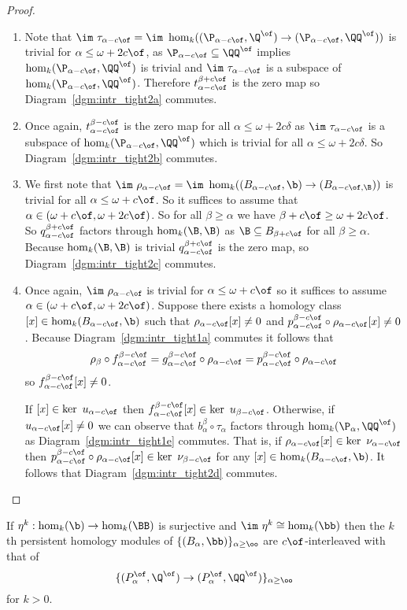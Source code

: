 \begin{proof}
  \begin{enumerate}[label=\Roman*.]
    \item Note that $\im~\tau_{\alpha-c\of} = \im~\hom_k((\P_{\alpha-c\of}, \Q^\of)\to (\P_{\alpha-c\of}, \QQ^\of))$ is trivial for $\alpha\leq \omega+2c\of$, as
    $\P_{\alpha-c\of}\subseteq \QQ^\of$ implies $\hom_k(\P_{\alpha-c\of}, \QQ^\of)$ is trivial and $\im~\tau_{\alpha-c\of}$ is a subspace of $\hom_k(\P_{\alpha-c\of}, \QQ^\of)$.
    Therefore $t_{\alpha-c\of}^{\beta+c\of}$ is the zero map so Diagram~\ref{dgm:intr_tight2a} commutes.
    \item Once again, $t_{\alpha-c\of}^{\beta-c\of}$ is the zero map for all $\alpha\leq\omega+2c\delta$ as $\im~\tau_{\alpha-c\of}$ is a subspace of $\hom_k(\P_{\alpha-c\of}, \QQ^\of)$ which is trivial for all $\alpha\leq\omega+2c\delta$.
    So Diagram~\ref{dgm:intr_tight2b} commutes.
    \item We first note that $\im~\rho_{\alpha-c\of} = \im~\hom_k((B_{\alpha-c\of}, \b)\to (B_{\alpha-c\of, \B}))$ is trivial for all $\alpha\leq \omega+c\of$.
    So it suffices to assume that $\alpha\in (\omega+c\of, \omega+2c\of)$.
    So for all $\beta\geq\alpha$ we have $\beta+c\of\geq\omega+2c\of$.
    So $q_{\alpha-c\of}^{\beta+c\of}$ factors through $\hom_k(\B, \B)$ as $\B\subseteq B_{\beta+c\of}$ for all $\beta\geq\alpha$.
    Because $\hom_k(\B, \B)$ is trivial $q_{\alpha-c\of}^{\beta+c\of}$ is the zero map, so Diagram~\ref{dgm:intr_tight2c} commutes.
    \item Once again, $\im~\rho_{\alpha-c\of}$ is trivial for $\alpha\leq\omega+c\of$ so it suffices to assume $\alpha\in (\omega+c\of, \omega+2c\of)$.
    Suppose there exists a homology class $[x]\in\hom_k(B_{\alpha-c\of}, \b)$ such that $\rho_{\alpha-c\of}[x]\neq 0$ and $p_{\alpha-c\of}^{\beta-c\of}\circ\rho_{\alpha-c\of}[x]\neq 0$.
    Because Diagram~\ref{dgm:intr_tight1a} commutes it follows that
    \[\rho_\beta\circ f_{\alpha-c\of}^{\beta-c\of} = g_{\alpha-c\of}^{\beta-c\of}\circ\rho_{\alpha-c\of} = p_{\alpha-c\of}^{\beta-c\of}\circ\rho_{\alpha-c\of}\]
    so $f_{\alpha - c\of}^{\beta-c\of}[x]\neq 0$.

    If $[x]\in\ker~u_{\alpha-c\of}$ then $f_{\alpha - c\of}^{\beta-c\of}[x]\in\ker~u_{\beta-c\of}$.
    Otherwise, if $u_{\alpha-c\of}[x]\neq 0$ we can observe that $b_\alpha^\beta\circ\tau_\alpha$ factors through $\hom_k(\P_\alpha, \QQ^\of)$ as Diagram~\ref{dgm:intr_tight1e} commutes.
    That is, if $\rho_{\alpha -c\of}[x]\in\ker~\nu_{\alpha-c\of}$ then $p_{\alpha-c\of}^{\beta-c\of}\circ\rho_{\alpha-c\of}[x]\in\ker~\nu_{\beta-c\of}$ for any $[x]\in \hom_k(B_{\alpha-c\of}, \b)$.
    It follows that Diagram~\ref{dgm:intr_tight2d} commutes.
  \end{enumerate}
\end{proof}

\begin{corollary}\label{cor:geo_inter}
  If $\eta^k : \hom_k(\b)\to \hom_k(\BB)$ is surjective and $\im~\eta^k\cong \hom_k(\bb)$ then the $k$th persistent homology modules of
  $\{(B_\alpha, \bb)\}_{\alpha\geq\oo}$ are $c\of$-interleaved with that of
  \[\{(P_\alpha^\of, \Q^\of)\to (P_\alpha^\of, \QQ^\of)\}_{\alpha\geq\oo}\]
  for $k > 0$.
\end{corollary}
